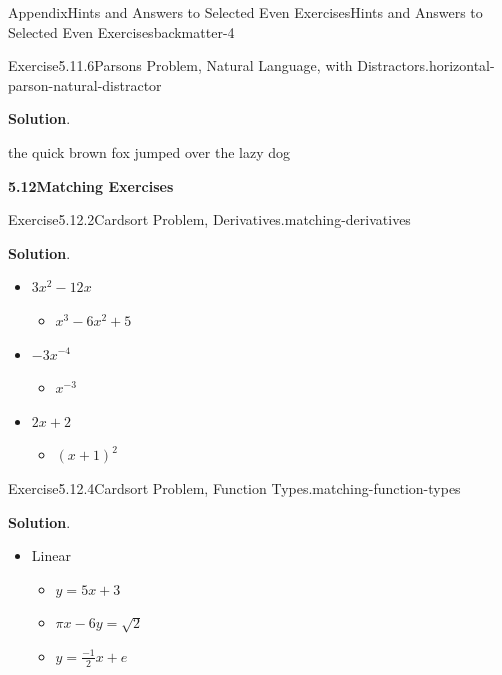 \documentclass[oneside,10pt,]{book}
\newcommand{\blocktitlefont}{\relax}
\numberwithin{equation}{section}
\begin{document}
\begin{solutions-chapter}{Appendix}{Hints and Answers to Selected Even Exercises}{}{Hints and Answers to Selected Even Exercises}{}{}{backmatter-4}
\begin{divisionsolution}{Exercise}{5.11.6}{Parsons Problem, Natural Language, with Distractors.}{horizontal-parson-natural-distractor}%
\par\smallskip%
\noindent\textbf{\blocktitlefont Solution}.\hypertarget{horizontal-parson-natural-distractor-3-back}{}\quad{}%
\begin{codedisplay}
the quick brown fox jumped over the lazy dog
\end{codedisplay}
%
\end{divisionsolution}%
\par\medskip
\noindent\textbf{\Large{}5.12\space\textperiodcentered\space{}Matching Exercises}
\begin{divisionsolution}{Exercise}{5.12.2}{Cardsort Problem, Derivatives.}{matching-derivatives}%
\par\smallskip%
\noindent\textbf{\blocktitlefont Solution}.\hypertarget{matching-derivatives-4-back}{}\quad{}%
\begin{itemize}[label=\textbullet]
\item{}\(3x^2-12x\)%
\begin{itemize}[label=$\circ$]
\item{}\(x^3-6x^2+5\)%
\end{itemize}
%
\item{}\(-3x^{-4}\)%
\begin{itemize}[label=$\circ$]
\item{}\(x^{-3}\)%
\end{itemize}
%
\item{}\(2x+2\)%
\begin{itemize}[label=$\circ$]
\item{}\((x+1)^2\)%
\end{itemize}
%
\end{itemize}
%
\end{divisionsolution}%
\begin{divisionsolution}{Exercise}{5.12.4}{Cardsort Problem, Function Types.}{matching-function-types}%
\par\smallskip%
\noindent\textbf{\blocktitlefont Solution}.\hypertarget{matching-function-types-4-back}{}\quad{}%
\begin{itemize}[label=\textbullet]
\item{}Linear%
\begin{itemize}[label=$\circ$]
\item{}\(y=5x+3\)%
\item{}\(\pi x - 6y = \sqrt{2}\)%
\item{}\(y=\frac{-1}{2}x+e\)%

\end{itemize}
\end{itemize}
\end{divisionsolution}
\end{solutions-chapter}
\end{document}
